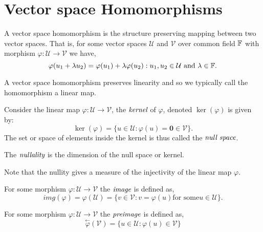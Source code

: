 \section{Vector space Homomorphisms} %
\label{sec:linearmaps}

\begin{defn}
	A vector space homomorphism is the structure preserving mapping between two vector spaces.
	That is, for some vector spaces $\mathcal{U}$ and $\mathcal{V}$ over common field $\mathbb{F}$
	with morphism $\varphi : \mathcal{U} \to \mathcal{V}$ we have,
	\[
		\varphi(u_1 + \lambda u_2) = \varphi(u_1) + \lambda \varphi(u_2) : u_1,u_2 \in \mathcal{U} \text{ and } \lambda \in \mathbb{F}.
	\]
\end{defn}

\begin{rem}
	A vector space homomorphism preserves linearity and so we typically call the
	homomorphism a linear map.
\end{rem}

\begin{defn}[Kernel]
	Consider the linear map $\varphi : \mathcal{U} \to \mathcal{V}$, the
	$\emph{kernel}$ of $\varphi$, denoted $\ker(\varphi)$ is given by:
	\[
		\ker(\varphi) = \{ u \in \mathcal{U} : \varphi(u) = \mathbf{0} \in \mathcal{V} \}.
	\]
	The set or space of elements inside the kernel is thus called the $\emph{null space}$.
\end{defn}

\begin{defn}[Nullity]
	The $\emph{nullality}$ is the dimension of the null space or kernel.
\end{defn}

\begin{rem}
	Note that the nullity gives a measure of the injectivity of the linear map
	$\varphi$.
\end{rem}

\begin{defn}[Image]
	For some morphism $\varphi : \mathcal{U} \to \mathcal{V}$ the $\emph{image}$ is defined as,
	\[
		img(\varphi) =
		\varphi(\mathcal{U}) = \{ v \in \mathcal{V} : v = \varphi(u) \text{for some} u \in \mathcal{U} \}.
	\]
\end{defn}

\begin{defn}[Preimage]
	For some morphism $\varphi : \mathcal{U} \to \mathcal{V}$ the $\emph{preimage}$ is defined as,
	\[
		\stackrel{\leftarrow}{\varphi}(\mathcal{V}) = \{ u \in \mathcal{U} : \varphi(u) \in \mathcal{V} \}
	\]
\end{defn}

